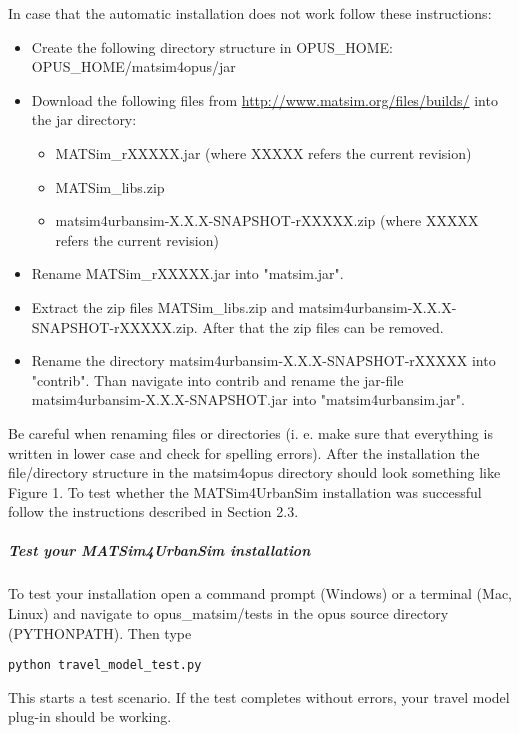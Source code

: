 \documentclass[a4paper,11pt]{report}
\begin{document}
In case that the automatic installation does not work follow these instructions:
\begin{itemize}
	\item Create the following directory structure in OPUS\_HOME: OPUS\_HOME/matsim4opus/jar
	\item Download the following files from \href{http://www.matsim.org/files/builds/}{http://www.matsim.org/files/builds/} into the jar directory:   
\begin{itemize}
	\item MATSim\_rXXXXX.jar (where XXXXX refers the current revision)
	\item MATSim\_libs.zip
	\item matsim4urbansim-X.X.X-SNAPSHOT-rXXXXX.zip (where XXXXX refers the current revision)
\end{itemize}
	\item Rename MATSim\_rXXXXX.jar into "matsim.jar".
	\item Extract the zip files MATSim\_libs.zip and matsim4urbansim-X.X.X-SNAPSHOT-rXXXXX.zip. After that the zip files can be removed.
	\item Rename the directory matsim4urbansim-X.X.X-SNAPSHOT-rXXXXX into  "contrib". Than navigate into contrib and rename the jar-file  matsim4urbansim-X.X.X-SNAPSHOT.jar into "matsim4urbansim.jar".
\end{itemize}

Be careful when renaming files or directories (i. e. make sure  that everything is written in lower case and check for spelling errors).  After the installation the file/directory structure in the matsim4opus  directory should look something like Figure 1. To test whether the  MATSim4UrbanSim installation was successful follow the instructions  described in Section 2.3.

\subparagraph{Test your MATSim4UrbanSim installation}

To test your installation open a command prompt (Windows) or a  terminal (Mac, Linux) and navigate to opus\_matsim/tests in the opus  source directory (PYTHONPATH). Then type


\texttt{python travel\_model\_test.py}

This starts a test scenario. If the test completes without errors, your travel model plug-in should be working.


\end{document}
